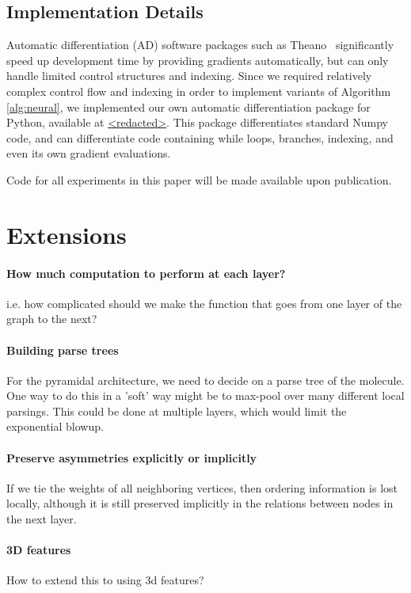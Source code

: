 \documentclass{article}
\begin{document}
\subsection{Implementation Details}
Automatic differentiation (AD) software packages such as
Theano~\citep{Bastien-Theano-2012, bergstra2010scipy} significantly speed up development time by providing gradients automatically, but can only handle limited control structures and indexing.
Since we required relatively complex control flow and indexing in order to implement variants of Algorithm \ref{alg:neural}, we implemented our own automatic differentiation package for Python, available at \url{<redacted>}.
This package differentiates standard Numpy~\citep{oliphant2007python} code, and can differentiate code containing
while loops, branches, indexing, and even its own gradient evaluations.

Code for all experiments in this paper will be made available upon publication.



\section{Extensions}

\paragraph{How much computation to perform at each layer?}
i.e. how complicated should we make the function that goes from one layer of the graph to the next?

\paragraph{Building parse trees}
For the pyramidal architecture, we need to decide on a parse tree of the molecule.
One way to do this in a 'soft' way might be to max-pool over many different local parsings.
This could be done at multiple layers, which would limit the exponential blowup.

\paragraph{Preserve asymmetries explicitly or implicitly}
If we tie the weights of all neighboring vertices, then ordering information is lost locally, although it is still preserved implicitly in the relations between nodes in the next layer.

\paragraph{3D features}
How to extend this to using 3d features?
\end{document}
